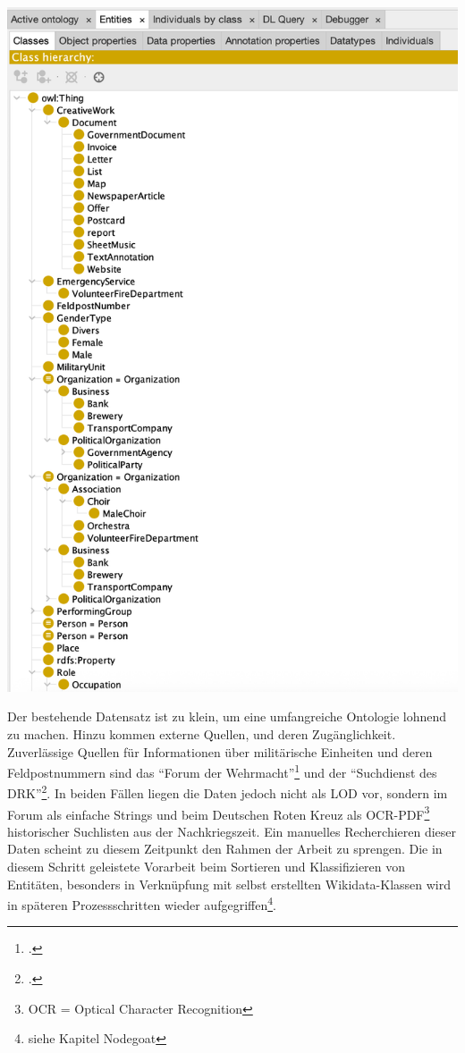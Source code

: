 \documentclass[12pt, a4paper, ngerman, bidi=default]{article}
\let\cite\footcite
\begin{document}
  \begin{minipage}[t]{0.43\textwidth}
    \centering
    \vspace*{0.3cm} %
    \includegraphics[width=\linewidth]{assets/Images/Bildschirmfoto_ttl_ontologie_Ausschnitt.png}
    \label{fig:ttl-ontologie}
\end{minipage}

\vspace{1em}

Der bestehende Datensatz ist zu klein, um eine umfangreiche Ontologie lohnend zu machen. Hinzu kommen externe Quellen, und deren Zugänglichkeit. Zuverlässige Quellen für Informationen 
über militärische Einheiten und deren Feldpostnummern sind das \enquote{Forum der Wehrmacht}\cite[ vgl.][]{altenburger_lexikon_nodate} 
und der \enquote{Suchdienst des DRK}\cite[ vgl.][]{reuter_drk_2025}. In beiden Fällen liegen die Daten jedoch nicht als LOD vor, sondern im Forum als einfache Strings 
und beim Deutschen Roten Kreuz als OCR-PDF\footnote{OCR = Optical Character Recognition} historischer Suchlisten aus der Nachkriegszeit. Ein manuelles Recherchieren dieser Daten scheint zu diesem Zeitpunkt
den Rahmen der Arbeit zu sprengen. Die in diesem Schritt geleistete Vorarbeit beim Sortieren und Klassifizieren von Entitäten, besonders in Verknüpfung mit selbst erstellten Wikidata-Klassen 
wird in späteren Prozessschritten wieder aufgegriffen\footnote{siehe Kapitel Nodegoat}.
\end{document}
